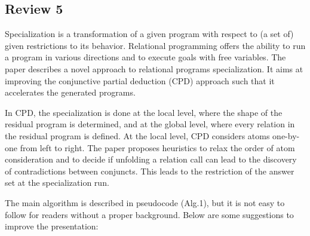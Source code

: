 
\subsection*{Review 5}

Specialization is a transformation of a given program with respect to (a set of) given restrictions to its behavior. Relational programming offers the ability to run a program in various directions and to execute goals with free variables. The paper describes a novel approach to relational programs specialization. It aims at improving the conjunctive partial deduction (CPD) approach such that it accelerates the generated programs.

In CPD, the specialization is done at the local level, where the shape of the residual program is determined, and at the global level, where every relation in the residual program is defined. At the local level, CPD considers atoms one-by-one from left to right. The paper proposes heuristics to relax the order of atom consideration and to decide if unfolding a relation call can lead to the discovery of contradictions between conjuncts. This leads to the restriction of the answer set at the specialization run.


The main algorithm is described in pseudocode (Alg.1), but it is not easy to follow for readers without a proper background. Below are some suggestions to improve the presentation:

